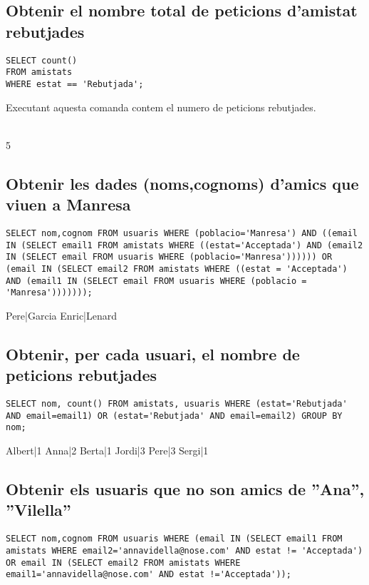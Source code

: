 \documentclass[11p]{article}
\begin{document}
\subsection{Obtenir el nombre total de peticions d’amistat rebutjades}

\begin{lstlisting}
SELECT count() 
FROM amistats 
WHERE estat == 'Rebutjada';

\end{lstlisting}

Executant aquesta comanda contem el numero de peticions rebutjades.\\\\
\centerline{5}

\subsection{Obtenir les dades (noms,cognoms) d’amics que viuen a Manresa}

\begin{lstlisting}
SELECT nom,cognom FROM usuaris WHERE (poblacio='Manresa') AND ((email IN (SELECT email1 FROM amistats WHERE ((estat='Acceptada') AND (email2 IN (SELECT email FROM usuaris WHERE (poblacio='Manresa')))))) OR (email IN (SELECT email2 FROM amistats WHERE ((estat = 'Acceptada') AND (email1 IN (SELECT email FROM usuaris WHERE (poblacio = 'Manresa')))))));
\end{lstlisting}

Pere|Garcia
Enric|Lenard

\subsection{Obtenir, per cada usuari, el nombre de peticions rebutjades}
\begin{lstlisting}
SELECT nom, count() FROM amistats, usuaris WHERE (estat='Rebutjada' AND email=email1) OR (estat='Rebutjada' AND email=email2) GROUP BY nom;
\end{lstlisting}

Albert|1
Anna|2
Berta|1
Jordi|3
Pere|3
Sergi|1

\subsection{Obtenir els usuaris que no son amics de ”Ana”, ”Vilella”}
\begin{lstlisting}
SELECT nom,cognom FROM usuaris WHERE (email IN (SELECT email1 FROM amistats WHERE email2='annavidella@nose.com' AND estat != 'Acceptada') OR email IN (SELECT email2 FROM amistats WHERE email1='annavidella@nose.com' AND estat !='Acceptada'));
\end{lstlisting}
\end{document}
